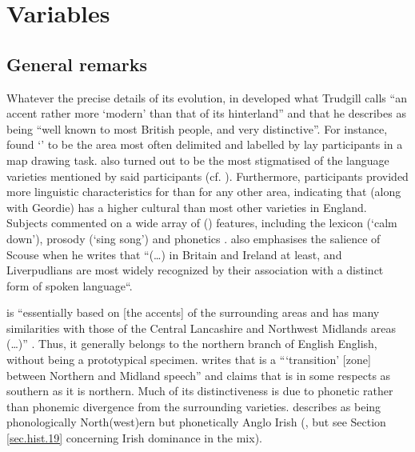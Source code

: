 \chapter{Variables}
\label{ch.var}

	\section{General remarks}\label{sec.var.general}

Whatever the precise details of its evolution, in  developed what Trudgill calls ``an accent rather more `modern' than that of its hinterland'' \citep[70]{trudgill1999} and that he describes as being ``well known to most British people, and very distinctive''.
For instance, \textcite{montgomery2007} found `' to be the  area most often delimited and labelled by lay participants in a map drawing task.
 also turned out to be the most stigmatised of the language varieties mentioned by said participants (cf. \cite[194 and 254]{montgomery2007}).
Furthermore, participants provided more linguistic characteristics for  than for any other  area, indicating that  (along with Geordie) has a higher cultural  than most other varieties in England.
Subjects commented on a wide array of () features, including the lexicon (`calm down'), prosody (`sing song') and phonetics \citep[cf.][180--181]{montgomery2007a}.
\textcite[15]{crowley2012} also emphasises the salience of Scouse when he writes that ``(\dots) in Britain and Ireland at least,  and Liverpudlians are most widely recognized by their association with a distinct form of spoken language``.

 is ``essentially based on [the accents] of the surrounding areas and has many similarities with those of the Central Lancashire and Northwest Midlands areas (\dots)'' \citep[70]{trudgill1999}.
Thus, it generally belongs to the northern branch of English English, without being a prototypical specimen.
\citet[18]{wales2006} writes that  is a ```transition' [zone] between Northern and Midland  speech'' and \citet[72]{trudgill1999} claims that  is in some respects as southern as it is northern.
Much of its distinctiveness is due to phonetic rather than phonemic divergence from the surrounding varieties. \textcite{knowles1973} describes  as being phonologically North(west)ern but phonetically Anglo Irish (\citealt[cf. also][80]{knowles1978}, but see Section \ref{sec.hist.19} concerning Irish dominance in the  mix).

